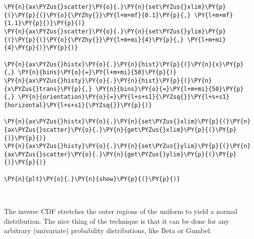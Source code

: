 \begin{tcolorbox}[breakable, size=fbox, boxrule=1pt, pad at break*=1mm,colback=cellbackground, colframe=cellborder]
\begin{Verbatim}[commandchars=\\\{\}]
\PY{n}{ax\PYZus{}scatter}\PY{o}{.}\PY{n}{set\PYZus{}xlim}\PY{p}{(}\PY{p}{(}\PY{o}{\PYZhy{}}\PY{l+m+mf}{0.1}\PY{p}{,} \PY{l+m+mf}{1.1}\PY{p}{)}\PY{p}{)}
\PY{n}{ax\PYZus{}scatter}\PY{o}{.}\PY{n}{set\PYZus{}ylim}\PY{p}{(}\PY{p}{(}\PY{o}{\PYZhy{}}\PY{l+m+mi}{4}\PY{p}{,} \PY{l+m+mi}{4}\PY{p}{)}\PY{p}{)}

\PY{n}{ax\PYZus{}histx}\PY{o}{.}\PY{n}{hist}\PY{p}{(}\PY{n}{x}\PY{p}{,} \PY{n}{bins}\PY{o}{=}\PY{l+m+mi}{50}\PY{p}{)}
\PY{n}{ax\PYZus{}histy}\PY{o}{.}\PY{n}{hist}\PY{p}{(}\PY{n}{x\PYZus{}trans}\PY{p}{,} \PY{n}{bins}\PY{o}{=}\PY{l+m+mi}{50}\PY{p}{,} \PY{n}{orientation}\PY{o}{=}\PY{l+s+s1}{\PYZsq{}}\PY{l+s+s1}{horizontal}\PY{l+s+s1}{\PYZsq{}}\PY{p}{)}

\PY{n}{ax\PYZus{}histx}\PY{o}{.}\PY{n}{set\PYZus{}xlim}\PY{p}{(}\PY{n}{ax\PYZus{}scatter}\PY{o}{.}\PY{n}{get\PYZus{}xlim}\PY{p}{(}\PY{p}{)}\PY{p}{)}
\PY{n}{ax\PYZus{}histy}\PY{o}{.}\PY{n}{set\PYZus{}ylim}\PY{p}{(}\PY{n}{ax\PYZus{}scatter}\PY{o}{.}\PY{n}{get\PYZus{}ylim}\PY{p}{(}\PY{p}{)}\PY{p}{)}

\PY{n}{plt}\PY{o}{.}\PY{n}{show}\PY{p}{(}\PY{p}{)}
\end{Verbatim}
\end{tcolorbox}

    \begin{center}
    \end{center}
    { \hspace*{\fill} \\}
    
    The inverse CDF stretches the outer regions of the uniform to yield a
normal distribution. The nice thing of the technique is that it can be
done for any arbitrary (univariate) probability distributions, like Beta
or Gumbel:

